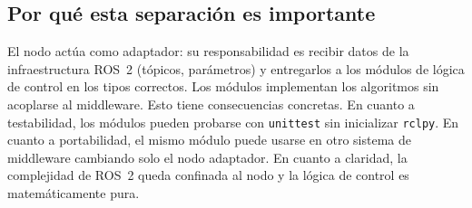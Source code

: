 \subsection{Por qué esta separación es importante}

El nodo actúa como adaptador: su responsabilidad es recibir datos de la infraestructura ROS~2 (tópicos, parámetros) y entregarlos a los módulos de lógica de control en los tipos correctos. Los módulos implementan los algoritmos sin acoplarse al middleware. Esto tiene consecuencias concretas. En cuanto a testabilidad, los módulos pueden probarse con \texttt{unittest} sin inicializar \texttt{rclpy}. En cuanto a portabilidad, el mismo módulo puede usarse en otro sistema de middleware cambiando solo el nodo adaptador. En cuanto a claridad, la complejidad de ROS~2 queda confinada al nodo y la lógica de control es matemáticamente pura.
